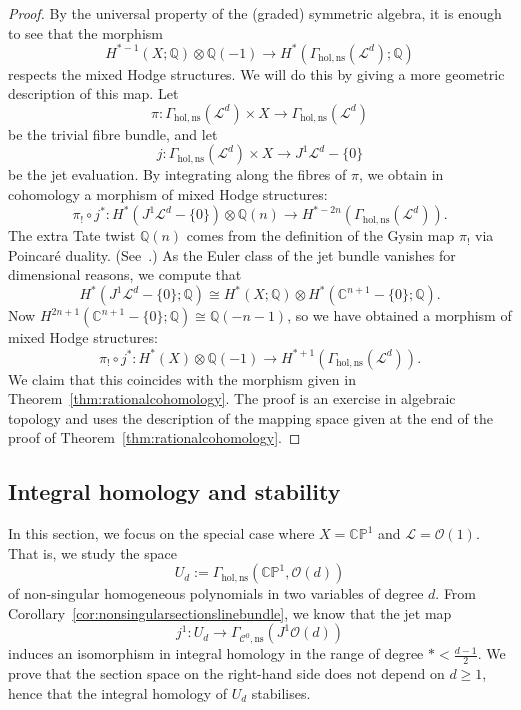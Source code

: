 \documentclass[a4paper]{amsart}
\newcommand{\bQ}{\mathbb Q}
\newcommand{\bC}{\mathbb C}
\newcommand{\bP}{\mathbb P}
\newcommand{\cC}{\mathcal C}
\newcommand{\cL}{\mathcal L}
\newcommand{\cO}{\mathcal O}
\newcommand{\lra}{\longrightarrow}
\theoremstyle{plain}
\theoremstyle{definition}
\begin{document}
\begin{proof}
By the universal property of the (graded) symmetric algebra, it is enough to see that the morphism
\[
    H^{*-1}(X;\bQ) \otimes \bQ(-1) \lra H^*(\Gamma_{\mathrm{hol,ns}}(\cL^d); \bQ)
\]
respects the mixed Hodge structures. We will do this by giving a more geometric description of this map. Let 
\[
    \pi \colon \Gamma_{\mathrm{hol,ns}}(\cL^d) \times X \lra \Gamma_{\mathrm{hol,ns}}(\cL^d)
\]
be the trivial fibre bundle, and let
\[
    j \colon \Gamma_{\mathrm{hol,ns}}(\cL^d) \times X \lra J^1 \cL^d - \{0\}
\]
be the jet evaluation. By integrating along the fibres of $\pi$, we obtain in cohomology a morphism of mixed Hodge structures:
\[
    \pi_! \circ j^* \colon H^*(J^1 \cL^d - \{0\}) \otimes \bQ(n) \lra H^{*-2n}(\Gamma_{\mathrm{hol,ns}}(\cL^d)).
\]
The extra Tate twist $\bQ(n)$ comes from the definition of the Gysin map $\pi_!$ via Poincaré duality. (See~\cite[Corollary 6.25]{peters_mixed_2008}.) As the Euler class of the jet bundle vanishes for dimensional reasons, we compute that
\[
    H^*(J^1 \cL^d - \{0\}; \bQ) \cong H^*(X; \bQ) \otimes H^*(\bC^{n+1} - \{0\}; \bQ).
\]
Now $H^{2n+1}(\bC^{n+1} - \{0\}; \bQ) \cong \bQ(-n-1)$, so we have obtained a morphism of mixed Hodge structures:
\[
    \pi_! \circ j^* \colon H^*(X) \otimes \bQ(-1) \lra H^{*+1}(\Gamma_{\mathrm{hol,ns}}(\cL^d)).
\]
We claim that this coincides with the morphism given in Theorem~\ref{thm:rationalcohomology}. The proof is an exercise in algebraic topology and uses the description of the mapping space given at the end of the proof of Theorem~\ref{thm:rationalcohomology}. 
\end{proof}


\subsection{Integral homology and stability}

In this section, we focus on the special case where $X = \bC\bP^1$ and $\cL = \cO(1)$. That is, we study the space 
\[
    U_d := \Gamma_{\mathrm{hol, ns}}\left(\bC\bP^1, \cO(d) \right)
\]
of non-singular homogeneous polynomials in two variables of degree $d$. From Corollary~\ref{cor:nonsingularsectionslinebundle}, we know that the jet map
\[
    j^1 \colon U_d \lra \Gamma_{\cC^0, \mathrm{ns}}\left( J^1\cO(d) \right)
\]
induces an isomorphism in integral homology in the range of degree $* < \frac{d-1}{2}$. We prove that the section space on the right-hand side does not depend on $d \geq 1$, hence that the integral homology of $U_d$ stabilises.
\end{document}
